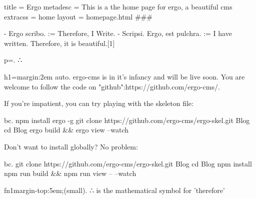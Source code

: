 title = Ergo
metadesc = This is a the home page for ergo, a beautiful cms
extracss = home
layout = homepage.html
###


- Ergo scribo. := Therefore, I Write.
- Scripsi. Ergo, est pulchra. :=  I have written. Therefore, it is beautiful.[1]


p=. ∴ 


h1={margin:2em auto}. ergo-cms is in it's infancy and will be live soon. You are welcome to follow the code on "github":https://github.com/ergo-cms/.

If you're impatient, you can try playing with the skeleton file:

bc. npm install ergo -g
git clone https://github.com/ergo-cms/ergo-skel.git Blog
cd Blog
ergo build && ergo view --watch

Don't want to install globally? No problem:

bc. git clone https://github.com/ergo-cms/ergo-skel.git Blog
cd Blog
npm install
npm run build && npm run view -- --watch


fn1{margin-top:5em;}(small). ∴ is the mathematical symbol for 'therefore'
